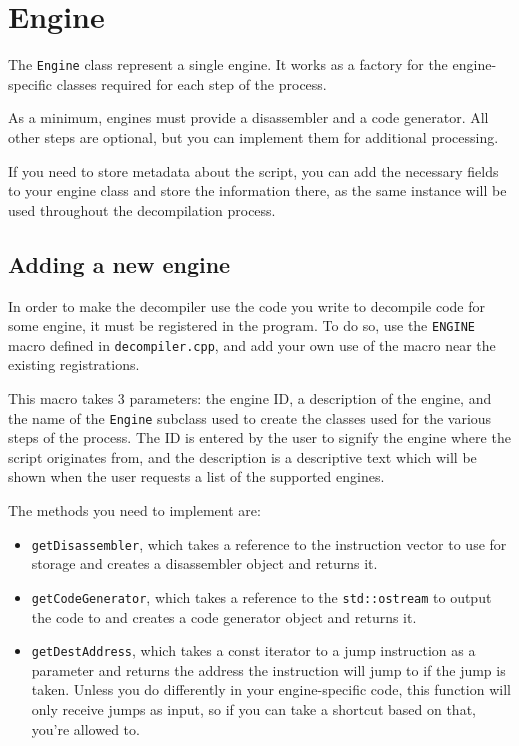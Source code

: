 \section{Engine}
The \verb+Engine+ class represent a single engine. It works as a factory for the engine-specific classes required for each step of the process.

As a minimum, engines must provide a disassembler and a code generator. All other steps are optional, but you can implement them for additional processing.

If you need to store metadata about the script, you can add the necessary fields to your engine class and store the information there, as the same instance will be used throughout the decompilation process.

\subsection{Adding a new engine}
In order to make the decompiler use the code you write to decompile code for some engine, it must be registered in the program. To do so, use the \verb+ENGINE+ macro defined in \verb+decompiler.cpp+, and add your own use of the macro near the existing registrations.

This macro takes 3 parameters: the engine ID, a description of the engine, and the name of the \verb+Engine+ subclass used to create the classes used for the various steps of the process. The ID is entered by the user to signify the engine where the script originates from, and the description is a descriptive text which will be shown when the user requests a list of the supported engines.

The methods you need to implement are:
\begin{itemize}
\item \verb+getDisassembler+, which takes a reference to the instruction vector to use for storage and creates a disassembler object and returns it.
\item \verb+getCodeGenerator+, which takes a reference to the \verb+std::ostream+ to output the code to and creates a code generator object and returns it.
\item \verb+getDestAddress+, which takes a const iterator to a jump instruction as a parameter and returns the address the instruction will jump to if the jump is taken. Unless you do differently in your engine-specific code, this function will only receive jumps as input, so if you can take a shortcut based on that, you're allowed to.
\end{itemize}

